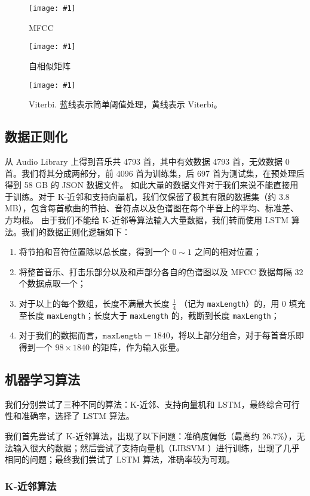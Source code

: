 \documentclass[a4paper,utf8,10pt]{article}
\newcommand{\sept}{\setlength\itemsep{-4pt}}
\newcommand{\somefigure}[4]{
  \begin{figure}[#4]
    \begin{center}
      \vspace{-10pt}
      \texttt{[image: \#1]}
      \vspace{-10pt}
      \caption{#2}
      \label{#3}
      \vspace{-10pt}
    \end{center}
  \end{figure}
}
\begin{document}
\somefigure{images/mfcc.937x400.jpg}{MFCC}{fig:mfcc}{p}
\somefigure{images/recurrence.800x400.jpg}{自相似矩阵}{fig:selfrec}{p}
\somefigure{images/viterbi.1045x308.jpg}{Viterbi. 蓝线表示简单阈值处理，黄线表示 Viterbi。}{fig:viterbi}{p}

\subsection{数据正则化}

\indent 从 Audio Library 上得到音乐共 4793 首，其中有效数据 4793 首，无效数据 0 首。我们将其分成两部分，前 4096 首为训练集，后 697 首为测试集，在预处理后得到 58 GB 的 JSON 数据文件。
如此大量的数据文件对于我们来说不能直接用于训练。对于 K-近邻和支持向量机，我们仅保留了极其有限的数据集（约 3.8 MB），包含每首歌曲的节拍、音符点以及色谱图在每个半音上的平均、标准差、方均根。
由于我们不能给 K-近邻等算法输入大量数据，我们转而使用 LSTM 算法。我们的数据正则化逻辑如下：

\begin{enumerate}
  \sept
  \item 将节拍和音符位置除以总长度，得到一个 $0 \sim 1$ 之间的相对位置；
  \item 将整首音乐、打击乐部分以及和声部分各自的色谱图以及 MFCC 数据每隔 32 个数据点取一个；
  \item 对于以上的每个数组，长度不满最大长度 $\displaystyle\frac{1}{4}$ （记为 \texttt{maxLength}）的，用 0 填充至长度 \texttt{maxLength}；长度大于 \texttt{maxLength} 的，截断到长度 \texttt{maxLength}；
  \item 对于我们的数据而言，$\mathtt{maxLength} = 1840$，将以上部分组合，对于每首音乐即得到一个 $98 \times 1840$ 的矩阵，作为输入张量。
\end{enumerate}

\subsection{机器学习算法}

我们分别尝试了三种不同的算法：K-近邻、支持向量机和 LSTM，最终综合可行性和准确率，选择了 LSTM 算法。

我们首先尝试了 K-近邻算法，出现了以下问题：准确度偏低（最高约 26.7\%），无法输入很大的数据；然后尝试了支持向量机（LIBSVM \cite{CC01a}）进行训练，出现了几乎相同的问题；最终我们尝试了 LSTM 算法，准确率较为可观。

\subsubsection{K-近邻算法}
\end{document}
